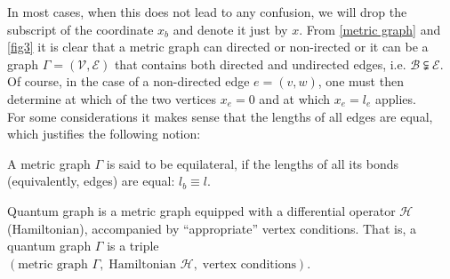 In most cases, when this does not lead to any confusion, we will drop the subscript of the coordinate $x_b$ and denote it just by $x$. From \cref{metric graph} and \cref{fig3} it is clear that a metric graph can directed or non-irected or it can be a graph $\Gamma = (\mathcal{V}, \mathcal{E})$ that contains both directed and undirected edges, i.e. $\mathcal{B} \subsetneqq \mathcal{E}$. Of course, in the case of a non-directed edge $e = (v, w)$, one must then determine at which of the two vertices $x_e = 0$ and at which $x_e = l_e$ applies. \\
For some considerations it makes sense that the lengths of all edges are equal, which justifies the following notion:

\begin{definition}\label{metric graph equilateral}
    A metric graph $\Gamma$ is said to be equilateral, if the lengths of all its bonds (equivalently, edges) are equal: $l_b \equiv l$.
\end{definition}





\begin{definition}
    \label{quantum graph}
    Quantum graph is a metric graph equipped with a differential operator $\mathcal{H}$ (Hamiltonian), accompanied by “appropriate” vertex conditions. That is, a quantum graph $\Gamma$ is a triple $(\text{metric graph } \Gamma, \; \text{Hamiltonian } \mathcal{H}, \; \text{vertex conditions})$.
\end{definition}



